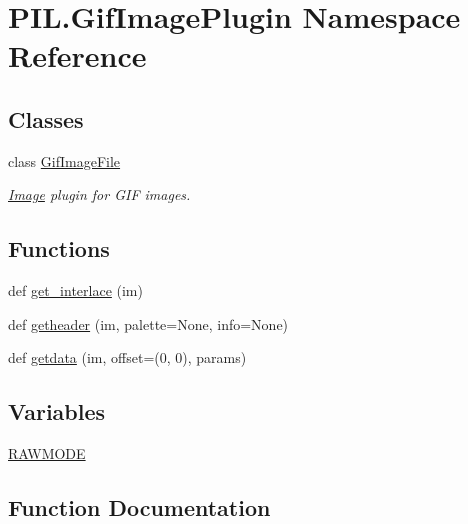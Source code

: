 \hypertarget{namespacePIL_1_1GifImagePlugin}{}\section{P\+I\+L.\+Gif\+Image\+Plugin Namespace Reference}
\label{namespacePIL_1_1GifImagePlugin}
\subsection*{Classes}
\begin{DoxyCompactItemize}
\item 
class \hyperlink{classPIL_1_1GifImagePlugin_1_1GifImageFile}{Gif\+Image\+File}
\begin{DoxyCompactList}\small\item\em \hyperlink{namespacePIL_1_1Image}{Image} plugin for G\+IF images. \end{DoxyCompactList}\end{DoxyCompactItemize}
\subsection*{Functions}
\begin{DoxyCompactItemize}
\item 
def \hyperlink{namespacePIL_1_1GifImagePlugin_add2e392be28d3eed884ff59e883036ca}{get\+\_\+interlace} (im)
\item 
def \hyperlink{namespacePIL_1_1GifImagePlugin_a483ab05e56fe4d40944b1806935caaa6}{getheader} (im, palette=None, info=None)
\item 
def \hyperlink{namespacePIL_1_1GifImagePlugin_a418eb734d37f1ca9314a2c82469d9d96}{getdata} (im, offset=(0, 0), params)
\end{DoxyCompactItemize}
\subsection*{Variables}
\begin{DoxyCompactItemize}
\item 
\hyperlink{namespacePIL_1_1GifImagePlugin_aecdec844c7e230b7a55c8f93d29ecdfd}{R\+A\+W\+M\+O\+DE}
\end{DoxyCompactItemize}


\subsection{Function Documentation}
\mbox{\label{namespacePIL_1_1GifImagePlugin_add2e392be28d3eed884ff59e883036ca}} 
